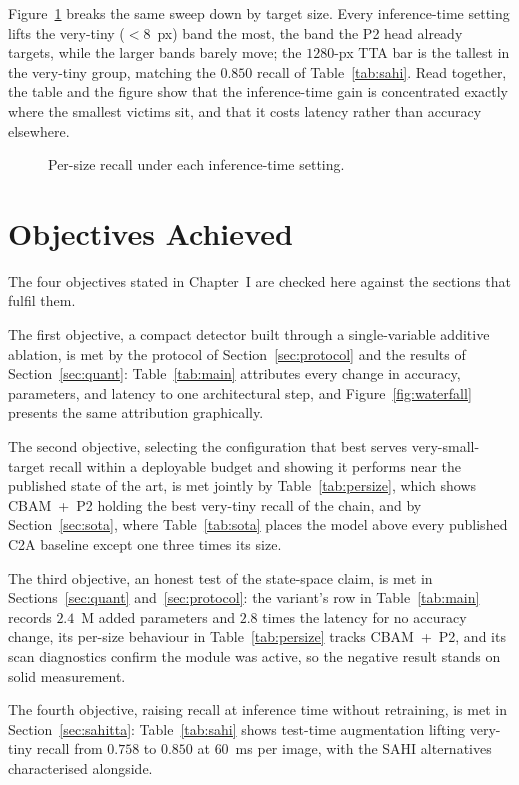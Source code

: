 Figure~\ref{fig:sahibars} breaks the same sweep down by target size. Every
inference-time setting lifts the very-tiny ($<8$~px) band the most, the band
the P2 head already targets, while the larger bands barely move; the
$1280$-px TTA bar is the tallest in the very-tiny group, matching the $0.850$
recall of Table~\ref{tab:sahi}. Read together, the table and the figure show
that the inference-time gain is concentrated exactly where the smallest
victims sit, and that it costs latency rather than accuracy elsewhere.

\begin{figure}[H]
  \centering
  \caption{Per-size recall under each inference-time setting.}
  \label{fig:sahibars}
\end{figure}

\section{Objectives Achieved}
\label{sec:objectives}
The four objectives stated in Chapter~I are checked here against the sections
that fulfil them.

The first objective, a compact detector built through a single-variable
additive ablation, is met by the protocol of Section~\ref{sec:protocol} and
the results of Section~\ref{sec:quant}: Table~\ref{tab:main} attributes every
change in accuracy, parameters, and latency to one architectural step, and
Figure~\ref{fig:waterfall} presents the same attribution graphically.

The second objective, selecting the configuration that best serves
very-small-target recall within a deployable budget and showing it performs
near the published state of the art, is met jointly by
Table~\ref{tab:persize}, which shows CBAM~+~P2 holding the best very-tiny
recall of the chain, and by Section~\ref{sec:sota}, where
Table~\ref{tab:sota} places the model above every published C2A baseline
except one three times its size.

The third objective, an honest test of the state-space claim, is met in
Sections~\ref{sec:quant} and~\ref{sec:protocol}: the variant's row in
Table~\ref{tab:main} records $2.4$~M added parameters and $2.8$ times the
latency for no accuracy change, its per-size behaviour in
Table~\ref{tab:persize} tracks CBAM~+~P2, and its scan diagnostics confirm
the module was active, so the negative result stands on solid measurement.

The fourth objective, raising recall at inference time without retraining,
is met in Section~\ref{sec:sahitta}: Table~\ref{tab:sahi} shows test-time
augmentation lifting very-tiny recall from $0.758$ to $0.850$ at $60$~ms per
image, with the SAHI alternatives characterised alongside.

